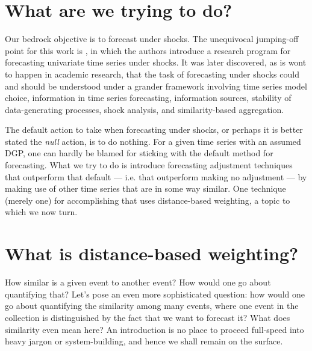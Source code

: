 \documentclass{uiucthesis2021}
\theoremstyle{definition}
\begin{document}
\section{What are we trying to do?}

Our bedrock objective is to forecast under shocks.  The unequivocal jumping-off point for this work is \cite[][]{lin2021minimizing}, in which the authors introduce a research program for forecasting univariate time series under shocks.  It was later discovered, as is wont to happen in academic research, that the task of forecasting under shocks could and should be understood under a grander framework involving time series model choice, information in time series forecasting, information sources, stability of data-generating processes, shock analysis, and similarity-based aggregation.  

The default action to take when forecasting under shocks, or perhaps it is better stated the \textit{null} action, is to do nothing.  For a given time series with an assumed DGP, one can hardly be blamed for sticking with the default method for forecasting.  What we try to do is introduce forecasting adjustment techniques that outperform that default --- i.e. that outperform making no adjustment --- by making use of other time series that are in some way similar.  One technique (merely one) for accomplishing that uses distance-based weighting, a topic to which we now turn.


\section{What is distance-based weighting?}
How similar is a given event to another event?  How would one go about quantifying that?  Let's pose an even more sophisticated question: how would one go about quantifying the similarity among many events, where one event in the collection is distinguished by the fact that we want to forecast it?  What does similarity even mean here?  An introduction is no place to proceed full-speed into heavy jargon or system-building, and hence we shall remain on the surface.  
\end{document}
